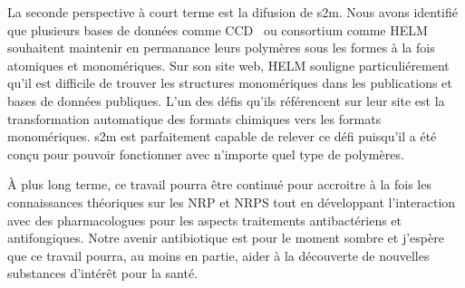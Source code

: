 La seconde perspective à court terme est la difusion de s2m.
Nous avons identifié que plusieurs bases de données comme CCD~\cite{rahman_small_2009} ou consortium comme HELM~\cite{_helm_????} souhaitent maintenir en permanance leurs polymères sous les formes à la fois atomiques et monomériques.
Sur son site web, HELM souligne particuliérement qu'il est difficile de trouver les structures monomériques dans les publications et bases de données publiques.
L'un des défis qu'ils référencent sur leur site est la transformation automatique des formats chimiques vers les formats monomériques.
s2m est parfaitement capable de relever ce défi puisqu'il a été conçu pour pouvoir fonctionner avec n'importe quel type de polymères.

À plus long terme, ce travail pourra être continué pour accroitre à la fois les connaissances théoriques sur les NRP et NRPS tout en développant l'interaction avec des pharmacologues pour les aspects traitements antibactériens et antifongiques.
Notre avenir antibiotique est pour le moment sombre et j'espère que ce travail pourra, au moins en partie, aider à la découverte de nouvelles substances d'intérêt pour la santé.

























